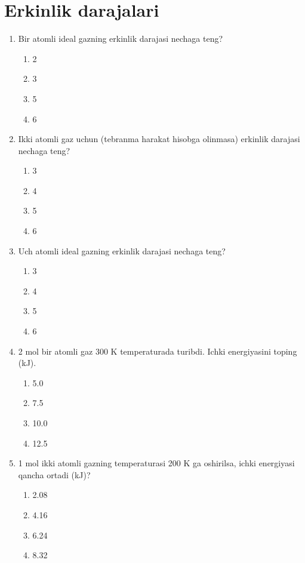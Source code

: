 \section{Erkinlik darajalari}


\begin{enumerate}
\item Bir atomli ideal gazning erkinlik darajasi nechaga teng?
\begin{enumerate}[label=\Alph*)]
\item 2
\item 3
\item 5
\item 6
\end{enumerate}

\item Ikki atomli gaz uchun (tebranma harakat hisobga olinmasa) erkinlik darajasi nechaga teng?
\begin{enumerate}[label=\Alph*)]
\item 3
\item 4
\item 5
\item 6
\end{enumerate}

\item Uch atomli ideal gazning erkinlik darajasi nechaga teng?
\begin{enumerate}[label=\Alph*)]
\item 3
\item 4
\item 5
\item 6
\end{enumerate}

\item 2 mol bir atomli gaz 300 K temperaturada turibdi. Ichki energiyasini toping (kJ).
\begin{enumerate}[label=\Alph*)]
\item 5.0
\item 7.5
\item 10.0
\item 12.5
\end{enumerate}

\item 1 mol ikki atomli gazning temperaturasi 200 K ga oshirilsa, ichki energiyasi qancha ortadi (kJ)?
\begin{enumerate}[label=\Alph*)]
\item 2.08
\item 4.16
\item 6.24
\item 8.32
\end{enumerate}


\end{enumerate}
